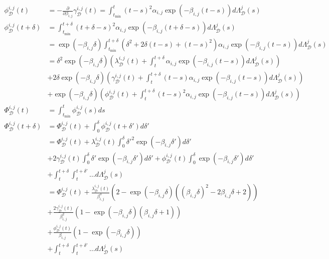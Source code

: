 \documentclass[honours,12pt]{unswthesis}
\numberwithin{equation}{section}
\begin{document}
\begin{equation*}
	\begin{align}
		\phi_\mathcal{D}^{i,j}(t) &= -\frac{\partial}{\partial\beta_{i,j}}\gamma_\mathcal{D}^{i,j}(t) = \int_{t_\mathrm{min}}^t (t-s)^2\alpha_{i,j}\exp(-\beta_{i,j}(t-s))d\Lambda_\mathcal{D}^j(s) \\
		\phi_\mathcal{D}^{i,j}(t+\delta) &= \int_{t_\mathrm{min}}^{t+\delta} (t+\delta-s)^2\alpha_{i,j}\exp(-\beta_{i,j}(t+\delta-s))d\Lambda_\mathcal{D}^j(s) \\
		&= \exp(-\beta_{i,j}\delta)\int_{t_\mathrm{min}}^{t+\delta} (\delta^2+2\delta(t-s)+(t-s)^2)\alpha_{i,j}\exp(-\beta_{i,j}(t-s))d\Lambda_\mathcal{D}^j(s) \\
		&= \delta^2\exp(-\beta_{i,j}\delta) \left( \lambda_\mathcal{D}^{i,j}(t) + \int_{t}^{t+\delta} \alpha_{i,j}\exp(-\beta_{i,j}(t-s))d\Lambda_\mathcal{D}^j(s) \right) \\
		&+ 2\delta\exp(-\beta_{i,j}\delta) \left( \gamma_\mathcal{D}^{i,j}(t) + \int_{t}^{t+\delta} (t-s)\alpha_{i,j}\exp(-\beta_{i,j}(t-s))d\Lambda_\mathcal{D}^j(s) \right) \\
		&+ \exp(-\beta_{i,j}\delta) \left( \phi_\mathcal{D}^{i,j}(t) + \int_{t}^{t+\delta} (t-s)^2\alpha_{i,j}\exp(-\beta_{i,j}(t-s))d\Lambda_\mathcal{D}^j(s) \right) \\
		\Phi_\mathcal{D}^{i,j}(t) &= \int_{t_\mathrm{min}}^t \phi_\mathcal{D}^{i,j}(s) ds \\
		\Phi_\mathcal{D}^{i,j}(t+\delta) &= \Phi_\mathcal{D}^{i,j}(t) + \int_0^\delta\phi_\mathcal{D}^{i,j}(t+\delta')d\delta' \\
		&= \Phi_\mathcal{D}^{i,j}(t) + \lambda_\mathcal{D}^{i,j}(t)\int_0^\delta\delta'^2\exp(-\beta_{i,j}\delta')d\delta'\\
		&+ 2\gamma_\mathcal{D}^{i,j}(t)\int_0^\delta\delta'\exp(-\beta_{i,j}\delta')d\delta' + \phi_\mathcal{D}^{i,j}(t)\int_0^\delta\exp(-\beta_{i,j}\delta')d\delta'\\
		&+ \int_t^{t+\delta}\int_t^{t+\delta'}\ldots d\Lambda_\mathcal{D}^{j}(s) \\
		&= \Phi_\mathcal{D}^{i,j}\left(t\right) + \frac{\lambda_\mathcal{D}^{i,j}\left(t\right)}{\beta_{i,j}^3}\left(2-\exp\left(-\beta_{i,j}\delta\right)\left(\left(\beta_{i,j}\delta\right)^2-2\beta_{i,j}\delta+2\right)\right)\\
		&+ \frac{2\gamma_\mathcal{D}^{i,j}(t)}{\beta_{i,j}^2}(1-\exp(-\beta_{i,j}\delta)(\beta_{i,j}\delta+1))\\
		&+ \frac{\phi_\mathcal{D}^{i,j}(t)}{\beta_{i,j}}(1-\exp(-\beta_{i,j}\delta))\\
		&+ \int_t^{t+\delta}\int_t^{t+\delta'}\ldots d\Lambda_\mathcal{D}^{j}(s)
	\end{align}
\end{equation*}
\end{document}
